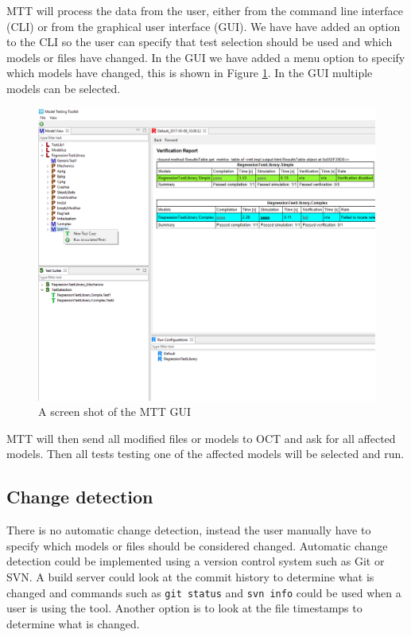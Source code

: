 \documentclass{cslthse-msc}
\begin{document}
MTT will process the data from the user, either from the command line interface (CLI) or from the graphical user interface (GUI). We have have added an option to the CLI so the user can specify that test selection should be used and which models or files have changed. In the GUI we have added a menu option to specify which models have changed, this is shown in Figure \ref{fig:MTTrun}. In the GUI multiple models can be selected.

\begin{figure}[!hbtp]
    \includegraphics[width=1.0\textwidth]{Pictures/MTT_Capture.png}
    \caption{A screen shot of the MTT GUI}
    \label{fig:MTTrun}
\end{figure}

MTT will then send all modified files or models to OCT and ask for all affected models. Then all tests testing one of the affected models will be selected and run.

\subsection{Change detection}
There is no automatic change detection, instead the user manually have to specify which models or files should be considered changed. Automatic change detection could be implemented using a version control system such as Git or SVN. A build server could look at the commit history to determine what is changed and commands such as \texttt{git status} and \texttt{svn info} could be used when a user is using the tool. Another option is to look at the file timestamps to determine what is changed.
\end{document}
